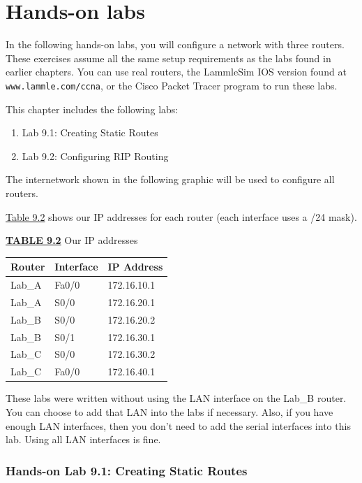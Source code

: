 \section{Hands-on labs}

In the following hands-on labs, you will configure a network with three
routers. These exercises assume all the same setup requirements as the
labs found in earlier chapters. You can use real routers, the LammleSim
IOS version found at \texttt{www.lammle.com/ccna}, or the Cisco Packet
Tracer program to run these labs.

This chapter includes the following labs:

\begin{enumerate}
\tightlist
\item
  Lab 9.1: Creating Static Routes
\item
  Lab 9.2: Configuring RIP Routing
\end{enumerate}

The internetwork shown in the following graphic will be used to
configure all routers.

\begin{figure}
\centering
\caption{}
\end{figure}

\protect\hyperlink{c09.xhtmlux5cux23table9-2}{Table 9.2} shows our IP
addresses for each router (each interface uses a /24 mask).

{\protect\hyperlink{c09.xhtmlux5cux23tableanchor9-2}{\textbf{TABLE 9.2}}
Our IP addresses}

\begin{longtable}[]{@{}lll@{}}
\toprule
Router & Interface & IP Address\tabularnewline
\midrule
\endhead
Lab\_A & Fa0/0 & 172.16.10.1\tabularnewline
Lab\_A & S0/0 & 172.16.20.1\tabularnewline
Lab\_B & S0/0 & 172.16.20.2\tabularnewline
Lab\_B & S0/1 & 172.16.30.1\tabularnewline
Lab\_C & S0/0 & 172.16.30.2\tabularnewline
Lab\_C & Fa0/0 & 172.16.40.1\tabularnewline
\bottomrule
\end{longtable}

\protect\hypertarget{c09.xhtmlux5cux23Page_402}{}{}These labs were
written without using the LAN interface on the Lab\_B router. You can
choose to add that LAN into the labs if necessary. Also, if you have
enough LAN interfaces, then you don't need to add the serial interfaces
into this lab. Using all LAN interfaces is fine.

\subsubsection[Hands-on Lab 9.1: Creating Static
Routes]{\texorpdfstring{\protect\hypertarget{c09.xhtmlux5cux23c09-sec-21}{}{}Hands-on
Lab 9.1: Creating Static
Routes}{Hands-on Lab 9.1: Creating Static Routes}}

